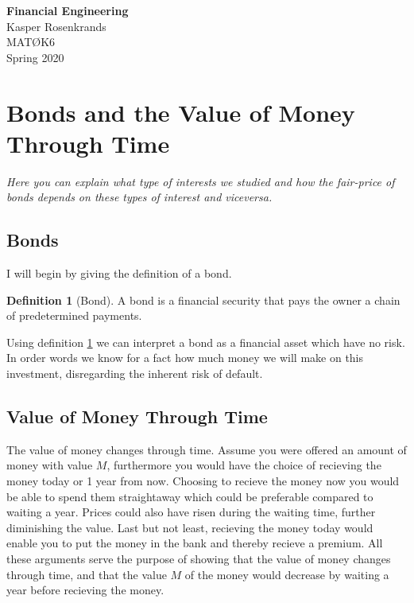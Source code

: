 \documentclass{article}
\theoremstyle{definition}
\newtheorem{definition}{Definition}[section]
\numberwithin{equation}{section}
\begin{document}
\begin{titlepage}
    \begin{center}
        {\huge\textbf{Financial Engineering}}\\[2mm]
        {\Large Kasper Rosenkrands}\\[2cm]
        {\large MATØK6}\\[2mm]
        {\large Spring 2020}
    \end{center}
    
    \vfill
\end{titlepage}

\section{Bonds and the Value of Money Through Time}
\textit{Here you can explain what type of interests we studied and how the fair-price of bonds depends on these types of interest and viceversa.}

\subsection{Bonds}
I will begin by giving the definition of a bond.
\begin{definition}[Bond]
    A bond is a financial security that pays the owner a chain of predetermined payments.\label{def:bond}
\end{definition}
Using definition \ref{def:bond} we can interpret a bond as a financial asset which have no risk.
In order words we know for a fact how much money we will make on this investment, disregarding the inherent risk of default.

\subsection{Value of Money Through Time}
The value of money changes through time.
Assume you were offered an amount of money with value $M$, furthermore you would have the choice of recieving the money today or 1 year from now.
Choosing to recieve the money now you would be able to spend them straightaway which could be preferable compared to waiting a year.
Prices could also have risen during the waiting time, further diminishing the value.
Last but not least, recieving the money today would enable you to put the money in the bank and thereby recieve a premium.
All these arguments serve the purpose of showing that the value of money changes through time, and that the value $M$ of the money would decrease by waiting a year before recieving the money.
\end{document}
